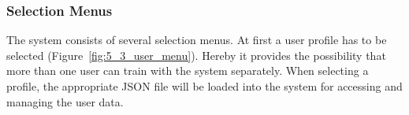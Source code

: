 \subsubsection{Selection Menus}
The system consists of several selection menus. At first a user profile has to be selected (Figure~\ref{fig:5_3_user_menu}). Hereby it provides the possibility that more than one user can train with the system separately.
When selecting a profile, the appropriate JSON file will be loaded into the system for accessing and managing the user data.

